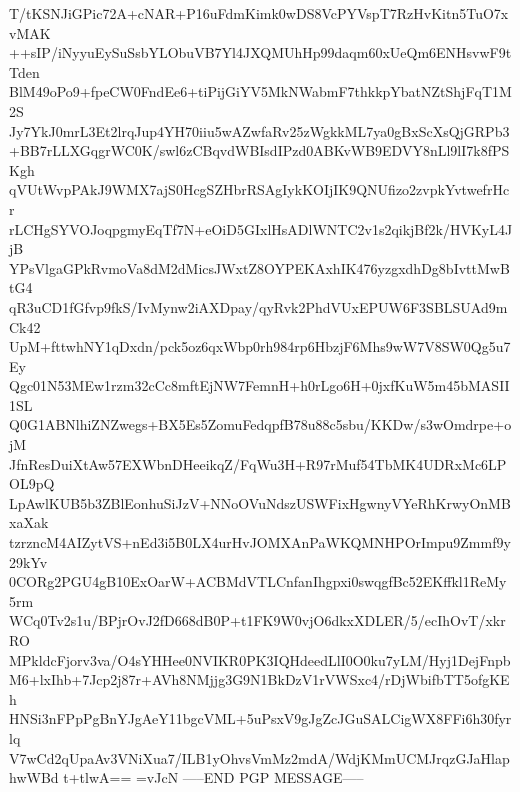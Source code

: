 T/tKSNJiGPic72A+cNAR+P16uFdmKimk0wDS8VcPYVspT7RzHvKitn5TuO7xvMAK
++sIP/iNyyuEySuSsbYLObuVB7Yl4JXQMUhHp99daqm60xUeQm6ENHsvwF9tTden
BlM49oPo9+fpeCW0FndEe6+tiPijGiYV5MkNWabmF7thkkpYbatNZtShjFqT1M2S
Jy7YkJ0mrL3Et2lrqJup4YH70iiu5wAZwfaRv25zWgkkML7ya0gBxScXsQjGRPb3
+BB7rLLXGqgrWC0K/swl6zCBqvdWBIsdIPzd0ABKvWB9EDVY8nLl9lI7k8fPSKgh
qVUtWvpPAkJ9WMX7ajS0HcgSZHbrRSAgIykKOIjIK9QNUfizo2zvpkYvtwefrHcr
rLCHgSYVOJoqpgmyEqTf7N+eOiD5GIxlHsADlWNTC2v1s2qikjBf2k/HVKyL4JjB
YPsVlgaGPkRvmoVa8dM2dMicsJWxtZ8OYPEKAxhIK476yzgxdhDg8bIvttMwBtG4
qR3uCD1fGfvp9fkS/IvMynw2iAXDpay/qyRvk2PhdVUxEPUW6F3SBLSUAd9mCk42
UpM+fttwhNY1qDxdn/pck5oz6qxWbp0rh984rp6HbzjF6Mhs9wW7V8SW0Qg5u7Ey
Qgc01N53MEw1rzm32cCc8mftEjNW7FemnH+h0rLgo6H+0jxfKuW5m45bMASII1SL
Q0G1ABNlhiZNZwegs+BX5Es5ZomuFedqpfB78u88c5sbu/KKDw/s3wOmdrpe+ojM
JfnResDuiXtAw57EXWbnDHeeikqZ/FqWu3H+R97rMuf54TbMK4UDRxMc6LPOL9pQ
LpAwlKUB5b3ZBlEonhuSiJzV+NNoOVuNdszUSWFixHgwnyVYeRhKrwyOnMBxaXak
tzrzncM4AIZytVS+nEd3i5B0LX4urHvJOMXAnPaWKQMNHPOrImpu9Zmmf9y29kYv
0CORg2PGU4gB10ExOarW+ACBMdVTLCnfanIhgpxi0swqgfBc52EKffkl1ReMy5rm
WCq0Tv2s1u/BPjrOvJ2fD668dB0P+t1FK9W0vjO6dkxXDLER/5/ecIhOvT/xkrRO
MPkldcFjorv3va/O4sYHHee0NVIKR0PK3IQHdeedLlI0O0ku7yLM/Hyj1DejFnpb
M6+lxIhb+7Jcp2j87r+AVh8NMjjg3G9N1BkDzV1rVWSxc4/rDjWbifbTT5ofgKEh
HNSi3nFPpPgBnYJgAeY11bgcVML+5uPsxV9gJgZcJGuSALCigWX8FFi6h30fyrlq
V7wCd2qUpaAv3VNiXua7/ILB1yOhvsVmMz2mdA/WdjKMmUCMJrqzGJaHlaphwWBd
t+tlwA==
=vJcN
-----END PGP MESSAGE-----
